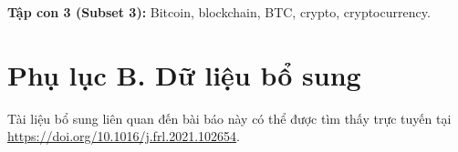 \textbf{Tập con 3 (Subset 3):} Bitcoin, blockchain, BTC, crypto, cryptocurrency.

\par{}

\section{Phụ lục B. Dữ liệu bổ sung}

Tài liệu bổ sung liên quan đến bài báo này có thể được tìm thấy trực tuyến tại \url{https://doi.org/10.1016/j.frl.2021.102654}.

